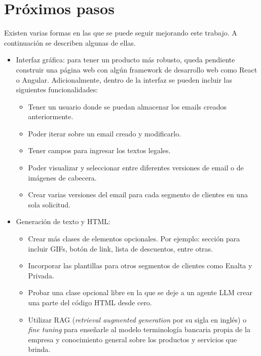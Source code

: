 \section{Próximos pasos}

Existen varias formas en las que se puede seguir mejorando este trabajo. A continuación se describen algunas de ellas.

\begin{itemize}
    \item Interfaz gráfica: para tener un producto más robusto, queda pendiente construir una página web con algún framework de desarrollo web como React o Angular. Adicionalmente, dentro de la interfaz se pueden incluir las siguientes funcionalidades:
    \begin{itemize}
        \item Tener un usuario donde se puedan almacenar los emails creados anteriormente.
        \item Poder iterar sobre un email creado y modificarlo.
        \item Tener campos para ingresar los textos legales.
        \item Poder visualizar y seleccionar entre diferentes versiones de email o de imágenes de cabecera.
        \item Crear varias versiones del email para cada segmento de clientes en una sola solicitud.
    \end{itemize}
    \item Generación de texto y HTML:
    \begin{itemize}
        \item Crear más clases de elementos opcionales. Por ejemplo: sección para incluir GIFs, botón de link, lista de descuentos, entre otras.
        \item Incorporar las plantillas para otros segmentos de clientes como Enalta y Privada.
        \item Probar una clase opcional libre en la que se deje a un agente LLM crear una parte del código HTML desde cero.
        \item Utilizar RAG (\textit{retrieval augmented generation} por su sigla en inglés) \cite{NEURIPS2020_6b493230} o \textit{fine tuning} para enseñarle al modelo terminología bancaria propia de la empresa y conocimiento general sobre los productos y servicios que brinda.

\end{itemize}
\end{itemize}
